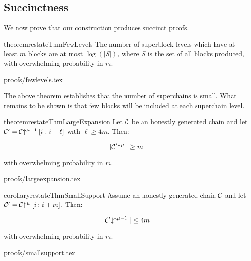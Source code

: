 \subsection{Succinctness}

We now prove that our construction produces succinct proofs.


\begin{restatable}{theorem}{restateThmFewLevels}
    \label{thm.few-levels}
    The number of superblock levels which have at least $m$ blocks are at most
    $\log(|S|)$, where $S$ is the set of all blocks produced, with overwhelming
    probability in $m$.
\end{restatable}

\ifonecolumn
{proofs/fewlevels.tex}
\fi

The above theorem establishes that the number of superchains is small. What
remains to be shown is that few blocks will be included at each superchain
level.

\begin{restatable}{theorem}{restateThmLargeExpansion}
    \label{thm.large-expansion}
    Let $\mathcal{C}$ be an honestly generated chain and let
    $\mathcal{C}' = \mathcal{C}\negthickspace\uparrow^{\mu - 1}[i:i + \ell]$ with $\ell \geq 4m$.
    Then:

    \begin{equation*}
      |\mathcal{C}'\negthickspace\uparrow^\mu| \geq m
    \end{equation*}

    with overwhelming probability in $m$.
\end{restatable}

\ifonecolumn
{proofs/largeexpansion.tex}
\fi

\begin{restatable}{corollary}{restateThmSmallSupport}
    \label{crly.small-support}
    Assume an honestly generated chain $\mathcal{C}$ and let $\mathcal{C}' = \mathcal{C}\negthickspace\uparrow^\mu[i:i + m]$. Then:

    \begin{equation}
      |\mathcal{C}'\negthickspace\downarrow\,\negthickspace\uparrow^{\mu - 1}| \leq 4m
    \end{equation}

    with overwhelming probability in $m$.
\end{restatable}

\ifonecolumn
{proofs/smallsupport.tex}
\fi

